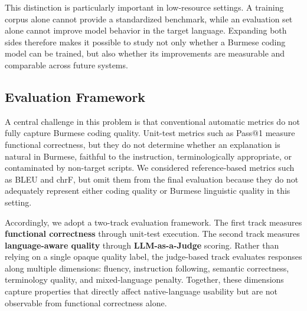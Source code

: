 \documentclass[11pt]{article}
\begin{document}
This distinction is particularly important in low-resource settings. A training corpus alone cannot provide a standardized benchmark, while an evaluation set alone cannot improve model behavior in the target language. Expanding both sides therefore makes it possible to study not only whether a Burmese coding model can be trained, but also whether its improvements are measurable and comparable across future systems.

\subsection{Evaluation Framework}

A central challenge in this problem is that conventional automatic metrics do not fully capture Burmese coding quality. Unit-test metrics such as Pass@1 measure functional correctness, but they do not determine whether an explanation is natural in Burmese, faithful to the instruction, terminologically appropriate, or contaminated by non-target scripts. We considered reference-based metrics such as BLEU and chrF, but omit them from the final evaluation because they do not adequately represent either coding quality or Burmese linguistic quality in this setting.

Accordingly, we adopt a two-track evaluation framework. The first track measures \textbf{functional correctness} through unit-test execution. The second track measures \textbf{language-aware quality} through \textbf{LLM-as-a-Judge} scoring. Rather than relying on a single opaque quality label, the judge-based track evaluates responses along multiple dimensions: fluency, instruction following, semantic correctness, terminology quality, and mixed-language penalty. Together, these dimensions capture properties that directly affect native-language usability but are not observable from functional correctness alone.
\end{document}
